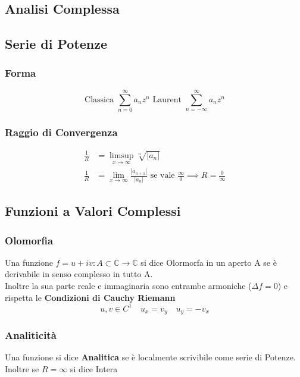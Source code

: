 \documentclass[a4paper,notitlepage]{report}%
\newcommand{\C}{\mathbb{C}}
\begin{document}
\begin{multicols*}{2}


\section*{Analisi Complessa}

\subsection*{Serie di Potenze}

\subsubsection*{Forma}
\[
\text{Classica }\sum_{n=0}^\infty a_n z^n \text{ Laurent }\sum_{n=-\infty}^\infty a_n z^n
\]

\subsubsection*{Raggio di Convergenza}
\begin{align*}
    \frac{1}{R} &= \limsup\limits_{x\rightarrow \infty} \sqrt[n]{ |a_n|} \\
    \frac{1}{R} &= \lim\limits_{x\rightarrow\infty} \frac{ |a_{n+1}| }{ |a_n| } \text{ se vale }\frac{\infty}{0}\implies R = \frac{0}{\infty}
\end{align*}

\subsection*{Funzioni a Valori Complessi}

\subsubsection*{Olomorfia}
Una funzione $f = u+iv:A\subset\C\to \C$ si dice Olormorfa in un aperto A se
è derivabile in senso complesso in tutto A.\\
Inoltre la sua parte reale e immaginaria sono entrambe armoniche ($\Delta f = 0$)
e rispetta le \textbf{Condizioni di Cauchy Riemann}
\[
    u,v \in C^1 \quad u_x = v_y \quad u_y = - v_x
\]

\subsubsection*{Analiticità}
Una funzione si dice \textbf{Analitica} se è localmente scrivibile come serie di Potenze.\\
Inoltre se $R=\infty$ si dice Intera


\end{multicols*}
\end{document}
